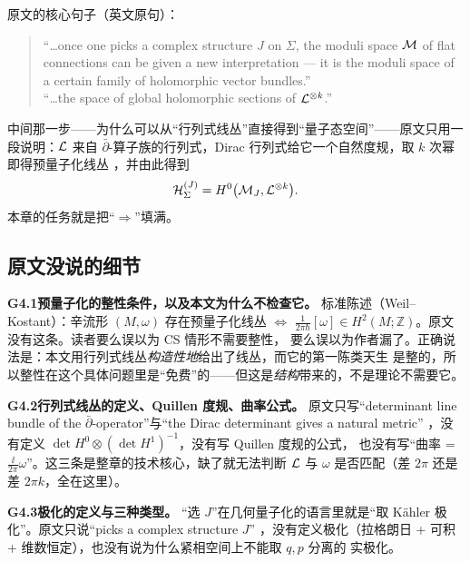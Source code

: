 原文的核心句子（英文原句）：

\begin{quote}\small
``\ldots once one picks a complex structure $J$ on $\Sigma$, the moduli space $\mathcal{M}$ of flat
connections can be given a new interpretation --- it is the moduli space of a certain family of
holomorphic vector bundles.'' \\[2pt]
``\ldots the space of global holomorphic sections of $\mathcal{L}^{\otimes k}$.'' 
\end{quote}
中间那一步——为什么可以从“行列式线丛”直接得到“量子态空间”——原文只用一段说明：$\mathcal{L}$ 来自
$\bar\partial$-算子族的行列式，Dirac 行列式给它一个自然度规，取 $k$ 次幂即得预量子化线丛
，并由此得到
\begin{equation}
\mathcal{H}_\Sigma^{(J)}=H^0\bigl(\mathcal{M}_J,\mathcal{L}^{\otimes k}\bigr).
\label{eq:ch4-hilbert}
\end{equation}
本章的任务就是把“$\Rightarrow$”填满。

\subsection{原文没说的细节}




\medskip
\noindent\textbf{G4.1}\quad \textbf{预量子化的整性条件，以及本文为什么不检查它。}
标准陈述（Weil--Kostant）：辛流形 $(M,\omega)$ 存在预量子化线丛 $\iff$
$\frac{1}{2\pi\hbar}[\omega]\in H^2(M;\mathbb Z)$。原文没有这条。读者要么误以为 CS 情形不需要整性，
要么误以为作者漏了。正确说法是：本文用行列式线丛\emph{构造性地}给出了线丛，而它的第一陈类天生
是整的，所以整性在这个具体问题里是“免费”的——但这是\emph{结构}带来的，不是理论不需要它。



\medskip
\noindent\textbf{G4.2}\quad \textbf{行列式线丛的定义、Quillen 度规、曲率公式。}
原文只写“determinant line bundle of the $\bar\partial$-operator”与“the Dirac determinant gives a
natural metric” ，没有定义 $\det H^0\otimes(\det H^1)^{-1}$，没有写 Quillen 度规的公式，
也没有写“曲率 = $\frac{\ii}{2\pi}\omega$”。这三条是整章的技术核心，缺了就无法判断 $\mathcal{L}$ 与 $\omega$
是否匹配（差 $2\pi$ 还是差 $2\pi k$，全在这里）。



\medskip
\noindent\textbf{G4.3}\quad \textbf{极化的定义与三种类型。}
“选 $J$”在几何量子化的语言里就是“取 Kähler 极化”。原文只说“picks a complex structure $J$”
，没有定义极化（拉格朗日 + 可积 + 维数恒定），也没有说为什么紧相空间上不能取 $q,p$ 分离的
实极化。



